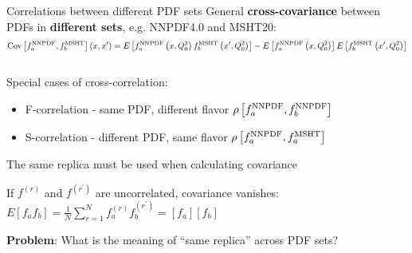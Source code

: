 \begin{frame}[t]{Correlations between different PDF sets}
  General {\bf cross-covariance} between PDFs in {\bf different sets}, e.g. NNPDF4.0 and MSHT20:
  $$
  \operatorname{Cov}\left[f_a^{\rm NNPDF}, f_b^{\rm MSHT}\right]\left(x, x^{\prime}\right)=E\left[f_a^{\rm NNPDF}\left(x, Q_0^2\right) f_b^{\rm MSHT}\left(x^{\prime}, Q_0^2\right)\right]-E\left[f_a^{\rm NNPDF}\left(x, Q_0^2\right)\right] E\left[f_b^{\rm MSHT}\left(x^{\prime}, Q_0^2\right)\right]
  $$
    \vspace*{0.3cm}
  \begin{columns}[T]
    \begin{column}{0.59\textwidth}
      Special cases of cross-correlation:
      \begin{itemize}
        \item F-correlation - same PDF, different flavor  $\rho\left[f_a^{\rm NNPDF}, f_b^{\rm NNPDF}\right]$
        \item S-correlation - different PDF, same flavor $\rho\left[f_a^{\rm NNPDF}, f_a^{\rm MSHT}\right]$
      \end{itemize}
      \begin{block}{}
        \centering
        {The same replica must be used when calculating covariance}
      \end{block}
      If $f^{(r)}$ and $f^{(r^\prime)}$ are uncorrelated, covariance vanishes: $E\left[f_a f_b\right]=\frac{1}{N} \sum_{r=1}^N f_a^{(r)} f_b^{(r^\prime)}=\left[ f_a\right]\left[ f_b\right]$

      \vspace*{0.3cm}
      {\bf Problem}: What is the meaning of ``same replica'' across PDF sets?
    \end{column}
    \begin{column}{0.39\textwidth}
    \end{column}
  \end{columns}
\end{frame}



